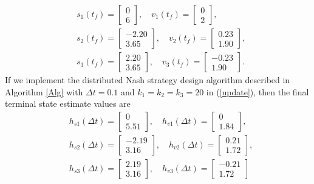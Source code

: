 \documentclass[letterpaper, 10 pt, conference,onecolumn]{ieeeconf}  %
\begin{document}
\begin{align*}
&s_1(t_f)=\begin{bmatrix}
0\\
6
\end{bmatrix},\quad
v_1(t_f)=\begin{bmatrix}
0\\
2
\end{bmatrix},\\
&s_2(t_f)=\begin{bmatrix}
-2.20\\
    3.65
    \end{bmatrix},\quad
    v_2(t_f)=\begin{bmatrix}
0.23\\
    1.90
\end{bmatrix},\\
&s_3(t_f)=\begin{bmatrix}
 2.20\\
    3.65
    \end{bmatrix},\quad
    v_3(t_f)=\begin{bmatrix}
-0.23\\
    1.90
\end{bmatrix}.\end{align*}
If we implement the distributed Nash strategy design algorithm described in Algorithm \ref{Alg} with $\Delta t=0.1$ and $k_1=k_2=k_3=20$ in (\ref{update}), then the final terminal state estimate values are
\begin{align*}
&h_{s1}(\Delta t)=\begin{bmatrix}
 0\\
    5.51
\end{bmatrix},\quad h_{v1}(\Delta t)=\begin{bmatrix}
  0\\
    1.84
\end{bmatrix},\\
&h_{s2}(\Delta t)=\begin{bmatrix}
 -2.19\\    3.16
\end{bmatrix},\quad h_{v2}(\Delta t)=\begin{bmatrix}
 0.21\\1.72
\end{bmatrix},\\
&h_{s3}(\Delta t)=\begin{bmatrix}
 2.19\\3.16
\end{bmatrix},\quad h_{v3}(\Delta t)=\begin{bmatrix}
-0.21\\    1.72
\end{bmatrix}
\end{align*}
\end{document}

